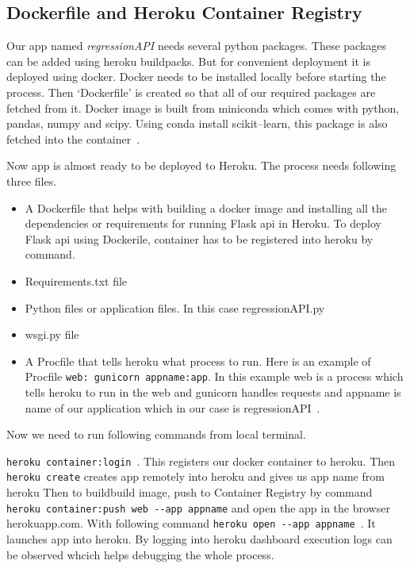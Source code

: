 \subsection{Dockerfile and Heroku Container Registry}
 Our app named \textit{regressionAPI} needs several python packages. These
 packages can be added using heroku buildpacks. But for convenient deployment
 it is deployed using docker. Docker needs to be installed locally before 
 starting the process. Then `Dockerfile' is created  so that
 all of our required packages are fetched from it. Docker image is built from
 miniconda which comes with python, pandas, numpy and scipy. Using conda install
 scikit--learn, this package is also fetched into the 
 container~\cite{hid-sp18-415-dockerfile}.  

Now app is almost ready to be deployed to Heroku. The process needs
following three files.

\begin{itemize}
 \item A Dockerfile that helps with building a docker image and installing 
 all the dependencies or requirements for running Flask api in Heroku.
 To deploy Flask api using Dockerile, container has to be registered into 
 heroku by command. 
 \item Requirements.txt file~\cite{hid-sp18-415-regapp}
 \item Python files or application files. In this case regressionAPI.py
 \item wsgi.py file~\cite{hid-sp18-415-regapp}
 \item A Procfile that tells heroku what process to run. Here is an example 
 of Procfile \verb|web: gunicorn appname:app|. In this example web is a 
 process which tells heroku to run in the web and gunicorn handles requests
 and appname is name of our application which in our case is 
 regressionAPI~\cite{hid-sp18-415-regressionapi}.
 \end{itemize}
 
 Now we need to run following commands from local terminal.
 
 \verb|heroku container:login|~\cite{hid-sp18-415-heroku-com}. This registers
 our docker container to heroku. Then \verb|heroku create| creates app remotely
 into heroku and gives us app name from heroku
 Then to buildbuild image, push to Container Registry by command 
 \verb|heroku container:push web --app appname| and open the app in the 
 browser  herokuapp.com. With following command
 \verb|heroku open --app appname|~\cite{hid-sp18-415-heroku-com}. It launches 
 app into heroku. By logging into heroku dashboard execution logs can
 be observed whcich helps debugging the whole process. 
 
